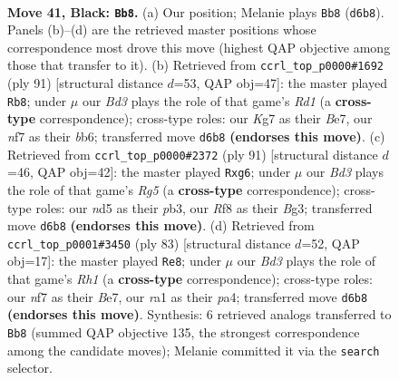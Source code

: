 \documentclass[11pt]{article}
\begin{document}
\clearpage

\begin{figure}[p]\centering
\begin{subfigure}{0.46\textwidth}\centering
\resizebox{\linewidth}{!}{%
\newchessgame
\chessboard[
  setfen={5r2/p4Nk1/P2b2P1/1P1N1p2/8/8/3K4/R1B5 b - - 2 41},
  showmover=false,
  pgfstyle=straightmove, color=movearrow, markmove={d6-b8}
]}
\caption{}
\end{subfigure}\hfill
\begin{subfigure}{0.46\textwidth}\centering
\resizebox{\linewidth}{!}{%
\newchessgame
\chessboard[
  setfen={3r4/4b3/1BRNp1k1/p2nP2p/P7/1P6/7P/7K b - - 0 46},
  showmover=false,
  pgfstyle=straightmove, color=movearrow, markmove={d8-b8}
]}
\caption{}
\end{subfigure}
\\[4pt]
\begin{subfigure}{0.46\textwidth}\centering
\resizebox{\linewidth}{!}{%
\newchessgame
\chessboard[
  setfen={8/8/6Pp/p1P2k2/6r1/1P4b1/P1K1RN2/8 b - - 2 46},
  showmover=false,
  pgfstyle=straightmove, color=movearrow, markmove={g4-g6}
]}
\caption{}
\end{subfigure}\hfill
\begin{subfigure}{0.46\textwidth}\centering
\resizebox{\linewidth}{!}{%
\newchessgame
\chessboard[
  setfen={7r/1p2b1R1/3kP3/5p2/P2PpN2/6B1/2n3K1/8 b - - 5 42},
  showmover=false,
  pgfstyle=straightmove, color=movearrow, markmove={h8-e8}
]}
\caption{}
\end{subfigure}
\caption{\textbf{Move 41, Black: \texttt{Bb8}.} (a) Our position; Melanie plays \texttt{Bb8} (\texttt{d6b8}). Panels (b)--(d) are the retrieved master positions whose correspondence most drove this move (highest QAP objective among those that transfer to it). (b) Retrieved from \texttt{ccrl\_top\_p0000\#1692} (ply 91) [structural distance $d$=53, QAP obj=47]: the master played \texttt{Rb8}; under $\mu$ our \emph{Bd3} plays the role of that game's \emph{Rd1} (a \textbf{cross-type} correspondence); cross-type roles: our \emph{K}g7 as their \emph{B}e7, our \emph{n}f7 as their \emph{b}b6; transferred move \texttt{d6b8} \textbf{(endorses this move)}. (c) Retrieved from \texttt{ccrl\_top\_p0000\#2372} (ply 91) [structural distance $d$=46, QAP obj=42]: the master played \texttt{Rxg6}; under $\mu$ our \emph{Bd3} plays the role of that game's \emph{Rg5} (a \textbf{cross-type} correspondence); cross-type roles: our \emph{n}d5 as their \emph{p}b3, our \emph{R}f8 as their \emph{B}g3; transferred move \texttt{d6b8} \textbf{(endorses this move)}. (d) Retrieved from \texttt{ccrl\_top\_p0001\#3450} (ply 83) [structural distance $d$=52, QAP obj=17]: the master played \texttt{Re8}; under $\mu$ our \emph{Bd3} plays the role of that game's \emph{Rh1} (a \textbf{cross-type} correspondence); cross-type roles: our \emph{n}f7 as their \emph{B}e7, our \emph{r}a1 as their \emph{p}a4; transferred move \texttt{d6b8} \textbf{(endorses this move)}. Synthesis: 6 retrieved analogs transferred to \texttt{Bb8} (summed QAP objective 135, the strongest correspondence among the candidate moves); Melanie committed it via the \texttt{search} selector.}
\label{fig:thought-m81}
\end{figure}
\end{document}
